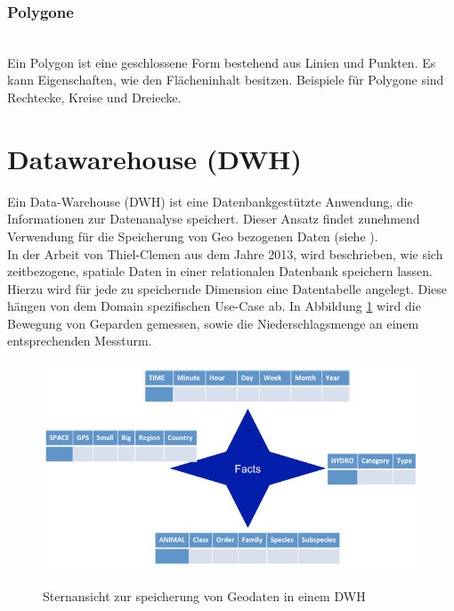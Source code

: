 \documentclass[10pt,conference,compsocconf]{IEEEtran}
\begin{document}
\subsubsection{Polygone}\hspace*{\fill} \\
Ein Polygon ist eine geschlossene Form bestehend aus Linien und Punkten. Es kann Eigenschaften, wie den Flächeninhalt besitzen. Beispiele für Polygone sind Rechtecke, Kreise und Dreiecke.


\section{Datawarehouse (DWH)}
Ein Data-Warehouse (DWH) ist eine Datenbankgestützte Anwendung, die Informationen zur Datenanalyse speichert. Dieser Ansatz findet zunehmend Verwendung für die Speicherung von Geo bezogenen Daten (siehe \cite{Kelling2009} \cite{McGuire2008}).\\
In der Arbeit von Thiel-Clemen\cite{ThielClemen2013} aus dem Jahre 2013, wird beschrieben, wie sich zeitbezogene, spatiale Daten in einer relationalen Datenbank speichern lassen.\\
Hierzu wird für jede zu speichernde Dimension eine Datentabelle angelegt. Diese hängen von dem Domain spezifischen Use-Case ab. In Abbildung \ref{img:star_schema} wird die Bewegung von Geparden gemessen, sowie die Niederschlagsmenge an einem entsprechenden Messturm.

\begin{figure}[H]
  \centering
  	\includegraphics[width=\columnwidth]{img/star_schema}\\
  \caption[]{Sternansicht zur speicherung von Geodaten in einem DWH\cite{ThielClemen2013}}
  \label{img:star_schema}
\end{figure}
\end{document}
